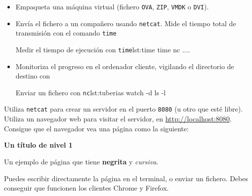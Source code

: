 \begin{homeworkProblem}
  \begin{itemize}
  \item Empaqueta una máquina virtual (fichero \texttt{OVA}, \texttt{ZIP}, \texttt{VMDK} o \texttt{DVI}).
  \item Envía el fichero a un compañero usando \texttt{netcat}. Mide el tiempo total de transmisión con el comando \texttt{time}

    \begin{listadoshell}{Medir el tiempo de ejecución con  \texttt{time}}{lst:time}
    time nc ....
  \end{listadoshell}
    
  \item Monitoriza el progreso en el ordenador cliente, vigilando el directorio de destino con

  \begin{listadoshell}{Enviar un fichero con \texttt{nc}}{lst:tuberias}
    watch -d ls -l
  \end{listadoshell}

    
  \end{itemize}
\end{homeworkProblem}

\begin{homeworkProblem}

  Utiliza \texttt{netcat} para crear un servidor en el puerto \texttt{8080} (u otro que esté libre). Utiliza un navegador web para visitar el servidor, en \url{http://localhost:8080}. Consigue que el navegador vea una página como la siguiente:

  \begin{cuadrito}
    {\large \textbf{Un título de nivel 1}}
    
    Un ejemplo de página que tiene \textbf{negrita} y \textit{cursiva}.
  \end{cuadrito}

  Puedes escribir directamente la página en el terminal, o enviar un fichero. Debes conseguir que funcionen los clientes Chrome y Firefox.
  
\end{homeworkProblem}



